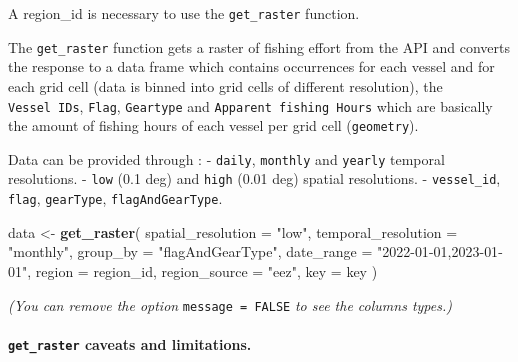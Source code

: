 \documentclass[
]{article}
\newenvironment{Shaded}{\begin{snugshade}}{\end{snugshade}}
\newcommand{\AttributeTok}[1]{\textcolor[rgb]{0.13,0.29,0.53}{#1}}
\newcommand{\FunctionTok}[1]{\textcolor[rgb]{0.13,0.29,0.53}{\textbf{#1}}}
\newcommand{\NormalTok}[1]{#1}
\newcommand{\OtherTok}[1]{\textcolor[rgb]{0.56,0.35,0.01}{#1}}
\newcommand{\SpecialCharTok}[1]{\textcolor[rgb]{0.81,0.36,0.00}{\textbf{#1}}}
\newcommand{\StringTok}[1]{\textcolor[rgb]{0.31,0.60,0.02}{#1}}
\begin{document}
A region\_id is necessary to use the \texttt{get\_raster} function.

\begin{Shaded}
\end{Shaded}

The \texttt{get\_raster} function gets a raster of fishing effort from
the API and converts the response to a data frame which contains
occurrences for each vessel and for each grid cell (data is binned into
grid cells of different resolution), the \texttt{Vessel\ IDs},
\texttt{Flag}, \texttt{Geartype} and \texttt{Apparent\ fishing\ Hours}
which are basically the amount of fishing hours of each vessel per grid
cell (\texttt{geometry}).

Data can be provided through : - \texttt{daily}, \texttt{monthly} and
\texttt{yearly} temporal resolutions. - \texttt{low} (0.1 deg) and
\texttt{high} (0.01 deg) spatial resolutions. - \texttt{vessel\_id},
\texttt{flag}, \texttt{gearType}, \texttt{flagAndGearType}.

\begin{Shaded}
\begin{Highlighting}[]
\NormalTok{data }\OtherTok{\textless{}{-}} \FunctionTok{get\_raster}\NormalTok{(}
  \AttributeTok{spatial\_resolution =} \StringTok{"low"}\NormalTok{,}
  \AttributeTok{temporal\_resolution =} \StringTok{"monthly"}\NormalTok{,}
  \AttributeTok{group\_by =} \StringTok{"flagAndGearType"}\NormalTok{,}
  \AttributeTok{date\_range =} \StringTok{"2022{-}01{-}01,2023{-}01{-}01"}\NormalTok{,}
  \AttributeTok{region =}\NormalTok{ region\_id,}
  \AttributeTok{region\_source =} \StringTok{"eez"}\NormalTok{,}
  \AttributeTok{key =}\NormalTok{ key}
\NormalTok{)}
\end{Highlighting}
\end{Shaded}

\emph{(You can remove the option} \texttt{message\ =\ FALSE} \emph{to
see the columns types.)}

\hypertarget{get_raster-caveats-and-limitations.}{%
\paragraph{\texorpdfstring{\texttt{get\_raster} caveats and
limitations.}{get\_raster caveats and limitations.}}\label{get_raster-caveats-and-limitations.}}
\end{document}
